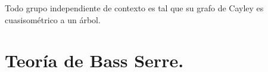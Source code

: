 \documentclass[tesis.tex]{subfiles}
\begin{document}
\begin{coro}
	Todo grupo independiente de contexto es tal que su grafo de Cayley es cuasisométrico a un árbol.
\end{coro}

\section{Teoría de Bass Serre.}



	
	
	
	
\end{document}
